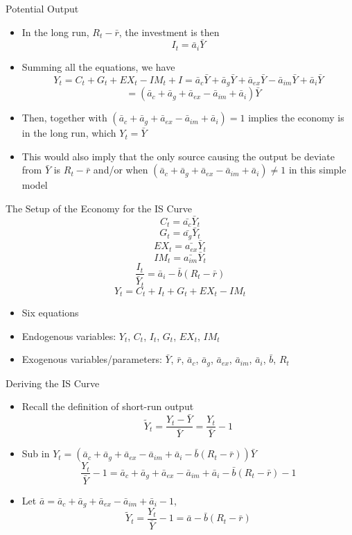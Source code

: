 \documentclass[aspectratio=1610]{beamer}
\begin{document}
\begin{frame}[wide]{Potential Output}
	\begin{itemize}
		\item In the long run, $R_t - \bar{r}$, the investment is then
		\[I_t = \bar{a}_i \bar{Y}\]
		\vspace{1mm}
		\item Summing all the equations, we have 
		\[Y_t = C_t+G_t+EX_t-IM_t +I =\bar{a}_c \bar{Y} +\bar{a}_g \bar{Y} + \bar{a}_{ex} \bar{Y} - \bar{a}_{im} \bar{Y} + \bar{a}_i \bar{Y}\]
		\[\quad = \left(\bar{a}_c  +\bar{a}_g  + \bar{a}_{ex} - \bar{a}_{im} + \bar{a}_i\right) \bar{Y}\]
		\vspace{1mm}
		\item Then, together with $\left(\bar{a}_c  +\bar{a}_g  + \bar{a}_{ex} - \bar{a}_{im} + \bar{a}_i\right) = 1$ implies the economy is in the long run, which $Y_t = \bar{Y}$
		\vspace{1mm}
		\item This would also imply that the only source causing the output be deviate from $\bar{Y}$ is $R_t - \bar{r}$ and/or when $\left(\bar{a}_c  +\bar{a}_g  + \bar{a}_{ex} - \bar{a}_{im} + \bar{a}_i\right) \neq 1$ in this simple model
	\end{itemize}
\end{frame}

\begin{frame}[wide]{The Setup of the Economy for the IS Curve}
	\[C_t = \bar{a_c}\bar{Y}_t	\]
	\[G_t = \bar{a_g}\bar{Y}_t	\]
	\[EX_t = \bar{a_{ex}}\bar{Y}_t	\]
	\[IM_t = \bar{a_{im}}\bar{Y}_t	\]
	\[\frac{I_t}{\bar{Y}_t} = \bar{a}_i - \bar{b}\left(R_t -\bar{r}\right)\]
	\[Y_t = C_t + I_t + G_t +EX_t -IM_t\]
	\begin{itemize}
		\item Six equations
		\item Endogenous variables: $Y_t$, $C_t$, $I_t$, $G_t$, $EX_t$, $IM_t$
		\item Exogenous variables/parameters: $\bar{Y}$, $\bar{r}$, $\bar{a}_c$, $\bar{a}_g$, $\bar{a}_{ex}$, $\bar{a}_{im}$, $\bar{a}_i$, $\bar{b}$, $R_t$
	\end{itemize}
\end{frame}

\begin{frame}[wide]{Deriving the IS Curve}
	\begin{itemize}
		\item Recall the definition of short-run output
		\[\tilde{Y}_t = \frac{Y_t - \bar{Y}}{\bar{Y}} = \frac{Y_t}{\bar{Y}} -1\]
		\vspace{4mm}
		\item Sub in $Y_t= \left(\bar{a}_c  +\bar{a}_g  + \bar{a}_{ex} - \bar{a}_{im} + \bar{a}_i -\bar{b} (R_t - \bar{r})\right) \bar{Y}$
		\[\frac{Y_t}{\bar{Y}} -1 = \bar{a}_c  +\bar{a}_g  + \bar{a}_{ex} - \bar{a}_{im} + \bar{a}_i -\bar{b} (R_t - \bar{r}) - 1\]
		\vspace{4mm}
		\item Let $\bar{a} = \bar{a}_c  +\bar{a}_g  + \bar{a}_{ex} - \bar{a}_{im} + \bar{a}_i -1$,
		\[\tilde{Y}_t = \frac{Y_t}{\bar{Y}} -1 =  \bar{a}-\bar{b} (R_t - \bar{r})\]
	\end{itemize}
\end{frame}
\end{document}
